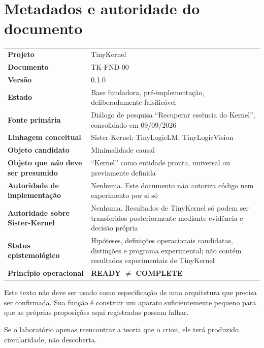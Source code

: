 \documentclass[11pt,a4paper]{article}
\begin{document}
\section*{Metadados e autoridade do documento}

\begin{tabularx}{\textwidth}{>{\bfseries}p{4.1cm}X}
\toprule
Projeto & TinyKernel \\
Documento & TK-FND-00 \\
Versão & 0.1.0 \\
Estado & Base fundadora, pré-implementação, deliberadamente falsificável \\
Fonte primária & Diálogo de pesquisa “Recuperar essência do Kernel”, consolidado em 09/09/2026 \\
Linhagem conceitual & Sister-Kernel; TinyLogicLM; TinyLogicVision \\
Objeto candidato & Minimalidade causal \\
Objeto que \emph{não} deve ser presumido & “Kernel” como entidade pronta, universal ou previamente definida \\
Autoridade de implementação & Nenhuma. Este documento não autoriza código nem experimento por si só \\
Autoridade sobre Sister-Kernel & Nenhuma. Resultados de TinyKernel só podem ser transferidos posteriormente mediante evidência e decisão própria \\
Status epistemológico & Hipóteses, definições operacionais candidatas, distinções e programa experimental; não contém resultados experimentais de TinyKernel \\
Princípio operacional & \textbf{READY $\neq$ COMPLETE} \\
\bottomrule
\end{tabularx}

\begin{warningbox}
Este texto não deve ser usado como especificação de uma arquitetura que precisa ser
confirmada. Sua função é construir um aparato suficientemente pequeno para que as
próprias proposições aqui registradas possam falhar.

Se o laboratório apenas reencontrar a teoria que o criou, ele terá produzido
circularidade, não descoberta.
\end{warningbox}

\tableofcontents
\newpage
\end{document}
